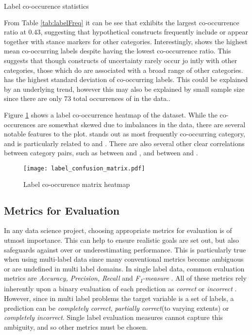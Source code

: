 \documentclass[Dissertation.tex]{subfiles}
\begin{document}
\begin{table}
	\caption{Label co-occurence statistics}
	\label{tab:labelFreq}
	
	
\end{table}

From Table \ref{tab:labelFreq} it can be see that  exhibits the largest co-occurrence ratio at $ 0.43 $, suggesting that hypothetical constructs frequently include or appear together with stance markers for other categories. Interestingly,  shows the highest mean co-occurring labels despite having the lowest co-occurrence ratio. This suggests that though constructs of uncertainty rarely occur jo	intly with other categories, those which do are associated with a broad range of other categories.  has the highest standard deviation of co-occurring labels. This could be explained by an underlying trend, however this may also be explained by small sample size since there are only $ 73 $ total occurrences of  in the data..

Figure \ref{fig:labCoOc} shows a label co-occurrence heatmap of the dataset. While the co-occurences are somewhat skewed due to imbalances in the data, there are several notable features to the plot.  stands out as most frequently co-occurring category,  and is particularly related to  and .	 There are also several other clear correlations between category pairs, such as between  and , and between  and .


\begin{figure}
	\centering
	\hspace*{1em}
	\texttt{[image: label\_confusion\_matrix.pdf]}
	\caption{Label co-occurence matrix heatmap}
	\label{fig:labCoOc}
\end{figure}




\subsection{Metrics for Evaluation}
In any data science project, choosing appropriate metrics for evaluation is of utmost importance. This can help to ensure realistic goals are set out, but also  safeguards against over or underestimating performance. This is particularly true when using multi-label data since many conventional metrics become ambiguous or are undefined in multi label domains. In single label data, common evaluation metrics are \textit{Accuracy, Precision, Recall} and \textit{F\textsubscript{1}-measure} \cite{sorowerLiteratureSurveyAlgorithms2018}. All of these metrics rely inherently upon a binary evaluation of each prediction as \textit{correct} or \textit{incorrect} \cite{sorowerLiteratureSurveyAlgorithms2018}. However, since in multi label problems the target variable is a set of labels, a prediction can be \textit{completely correct}, \textit{partially correct}(to varying extents) or \textit{completely incorrect}. Single label evaluation measures cannot capture this ambiguity, and so other metrics must be chosen.
\end{document}

